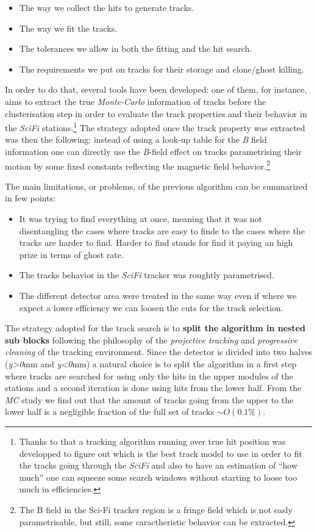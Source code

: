 \documentclass[paper=a4, fontsize=10pt]{scrartcl}
\numberwithin{equation}{section}		%
\numberwithin{figure}{section}			%
\numberwithin{table}{section}				%
\begin{document}
\begin{itemize}
\item{The way we collect the hits to generate tracks.}
\item{The way we fit the tracks.}
\item{The tolerances we allow in both the fitting and the hit search.}
\item{The requirements we put on tracks for their storage and clone/ghost killing.}
\end{itemize}

In order to do that, several tools have been developed: one of them, for instance, aims to extract the true \textit{Monte-Carlo} information of tracks before the clusterisation step in order to evaluate the track properties and their behavior in the \textit{SciFi} stations.\footnote{Thanks to that a tracking algorithm running over true hit position was developped to figure out which is the best track model to use in order to fit the tracks going through the \textit{SciFi} and also to have an estimation of ``how much'' one can squeeze some search windows without starting to loose too much in efficiencies.} The strategy adopted once the track property was extracted was then the following: instead of using a look-up table for the \textit{B} field information one can directly use the \textit{B}-field effect on tracks parametrising their motion by some fixed constants reflecting the magnetic field behavior.\footnote{The B field in the Sci-Fi tracker region is a fringe field which is not easly parametrisable, but still, some caractheristic behavior can be extracted.}

The main limitations, or problems, of the previous algorithm can be summarized in few points:
\begin{itemize} 
\item{It was trying to find everything at once, meaning that it was not disentangling the cases where tracks are easy to finde to the cases where the tracks are harder to find. Harder to find stands for find it paying an high prize in terms of ghost rate.}
\item{The tracks behavior in the \textit{SciFi} tracker was roughtly parametrised.} 
\item{The different detector area were treated in the same way even if where we expect a lower efficiency we can loosen the cuts for the track selection.}
\end{itemize}

The strategy adopted for the track search is to \textbf{split the algorithm in nested sub blocks} following the philosophy of the \textit{projective tracking} and \textit{progressive cleaning} of the tracking environment. Since the detector is divided into two halves (\textit{y>0}mm and \textit{y<0}mm) a natural choice is to split the algorithm in a first step where tracks are searched for using only the hits in the upper modules of the stations and a second iteration is done using hits from the lower half. 
From the \textit{MC} study we find out that the amount of tracks going from the upper to the lower half is a negligible fraction of the full set of tracks \textit{$\sim O(0.1 \%)$}. 
\end{document}
